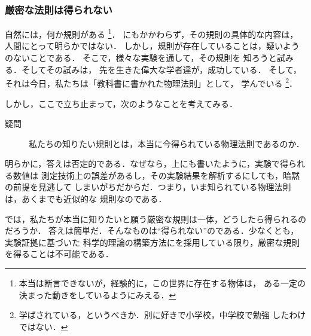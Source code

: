             \subsubsection{厳密な法則は得られない}
                自然には，何か規則がある
                    \footnote{
                        本当は断言できないが，経験的に，この世界に存在する物体は，
                        ある一定の決まった動きをしているようにみえる．
                    }．
                にもかかわらず，その規則の具体的な内容は，人間にとって明らかではない．
                しかし，規則が存在していることは，疑いようのないことである．
                そこで，様々な実験を通して，その規則を 知ろうと試みる．そしてその試みは，
                先を生きた偉大な学者達が，成功している．
                そして，それは今日，私たちは「教科書に書かれた物理法則」として，
                学んでいる
                    \footnote{
                        学ばされている，というべきか．別に好きで小学校，中学校で勉強
                        したわけではない．
                    }．

                しかし，ここで立ち止まって，次のようなことを考えてみる．
                    \begin{description}
                        \item[疑問] 私たちの知りたい規則とは，本当に今得られている物理法則であるのか．
                    \end{description}
                明らかに，答えは否定的である．なぜなら，上にも書いたように，実験で得られる数値は
                測定技術上の誤差があるし，その実験結果を解析するにしても，暗黙の前提を見逃して
                しまいがちだからだ．つまり，いま知られている物理法則は，あくまでも近似的な
                規則なのである．

                では，私たちが本当に知りたいと願う厳密な規則は一体，どうしたら得られるのだろうか．
                答えは簡単だ．そんなものは“得られない”のである．少なくとも，実験証拠に基づいた
                科学的理論の構築方法にを採用している限り，厳密な規則を得ることは不可能である．

